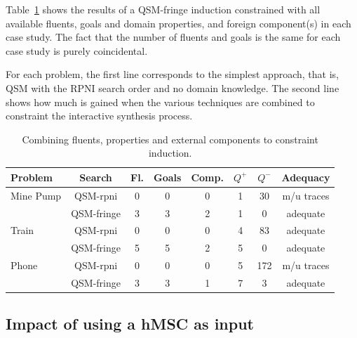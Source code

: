 Table~\ref{All:res} shows the results of a QSM-fringe induction constrained with all available fluents, goals and domain properties, and foreign component(s) in each case study. The fact that the number of fluents and goals is the same for each case study is purely coincidental. 

For each problem, the first line corresponds to the simplest approach, that is, QSM with the RPNI search order and no domain knowledge. The second line shows how much is gained when the various techniques are combined to constraint the interactive synthesis process.

\begin{table}[H]
\centering
\begin{small}
\begin{tabular}{|l||c|c|c|c||c|c|c|}\hline
Problem   & Search      & Fl. & Goals & Comp. &$Q^+$&$Q^-$& Adequacy\\\hline\hline
Mine Pump & QSM-rpni    & 0   & 0     & 0     & 1   & 30  & m/u traces\\\cline{2-8}
          & QSM-fringe  & 3   & 3     & 2     & 1   & 0   & adequate\\\hline\hline
Train     & QSM-rpni    & 0   & 0     & 0     & 4   & 83  & adequate\\\cline{2-8}
          & QSM-fringe  & 5   & 5     & 2     & 5   & 0   & adequate\\\hline\hline
Phone     & QSM-rpni    & 0   & 0     & 0     & 5   & 172 & m/u traces\\\cline{2-8}
          & QSM-fringe  & 3   & 3     & 1     & 7   & 3   & adequate\\\hline
\end{tabular}
\end{small}
\caption{Combining fluents, properties and external components to constraint induction\label{All:res}.}
\end{table}


\subsection{Impact of using a hMSC as input\label{subsection:evaluation-casestudies-asm}}

